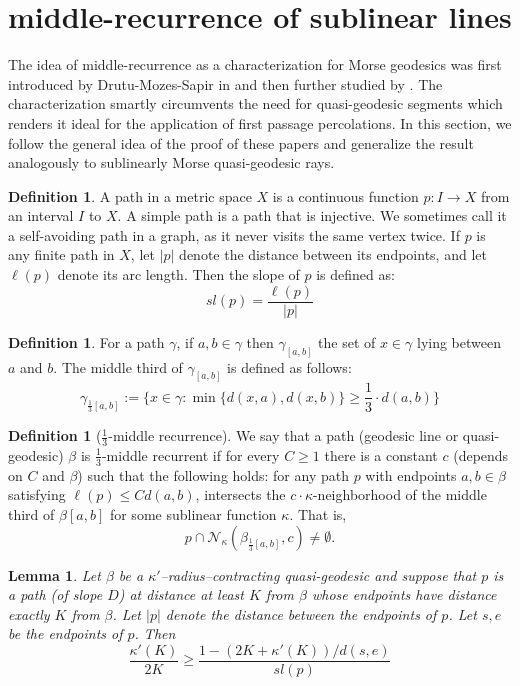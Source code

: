 \documentclass[12 pt]{amsart}
\newcommand{\calN}{\mathcal{N}}
\newtheorem{lemma}[theorem]{Lemma}
\theoremstyle{definition}
\newtheorem{definition}[theorem]{Definition}
\theoremstyle{remark}
\begin{document}
\section{middle-recurrence of sublinear lines}
The idea of middle-recurrence as a characterization for Morse geodesics was first introduced by Drutu-Mozes-Sapir in \cite{DMS} and then further studied by \cite{ADT}. The characterization smartly circumvents the need for quasi-geodesic segments which renders it ideal for the application of first passage percolations. In this section, we follow the general idea of the proof of these papers and generalize the result analogously to sublinearly Morse quasi-geodesic rays.
\begin{definition}
A path in a metric space $X$ is a continuous function $p: I\rightarrow X$ from an interval $I$ to $X$. A simple path is a path that is injective. We sometimes call it a self-avoiding path in a graph, as it never visits the same vertex twice. \newline
If $p$ is any finite path in $X$, let $|p|$ denote the distance between its endpoints, and let $\ell(p)$ denote its arc length. Then the slope of $p$ is defined as:
\[
sl(p) = \frac{\ell(p)}{|p|}
\]

\end{definition}
\begin{definition}

 For a path $\gamma$, if $a,b \in \gamma$ then  $\gamma_{[a,b]}$ the set of $x \in \gamma$ lying between $a$ and $b$. The middle third of $\gamma_{[a,b]}$ is defined as follows: \[ \gamma_{\frac{1}{3}[a,b]} := \biggl\{x\in \gamma : \min \{d(x,a),d(x,b)\} \ge \frac{1}{3}\cdot d(a,b)\biggr\}\]   


\end{definition}
\begin{definition}[$\frac{1}{3}$-middle recurrence]
    We say that a path (geodesic line or quasi-geodesic) $\beta$ is $\frac{1}{3}$-middle recurrent if for every $C\geq1$ there is a constant $c$ (depends on $C$ and $\beta$) such that the following holds:
    for any path $p$ with endpoints $a,b \in \beta$ satisfying $\ell(p)\leq Cd(a,b)$, intersects the $c\cdot \kappa$-neighborhood of the middle third of $\beta[a,b]$ for some sublinear function $\kappa$. That is,
\[ p \cap \calN_{\kappa} (\beta_{\frac 13[a,b]}, c )\neq \emptyset.\]
\end{definition}
\begin{lemma}\cite[Lemma 3.3]{ADT}\label{lemma33}
Let $\beta$ be a $\kappa'$–radius–contracting quasi-geodesic and suppose that $p$ is a path (of slope $D$) at distance
at least $K$  from $\beta$ whose endpoints have distance exactly $K$ from $\beta$. Let $|p|$ denote the distance between the endpoints of $p$. Let $s, e$ be the endpoints of $p$. Then
\[ \frac{\kappa'(K)}{2K} \geq \frac{1-(2K+\kappa'(K))/d(s, e)}{sl(p)}\]
\end{lemma}
\end{document}
